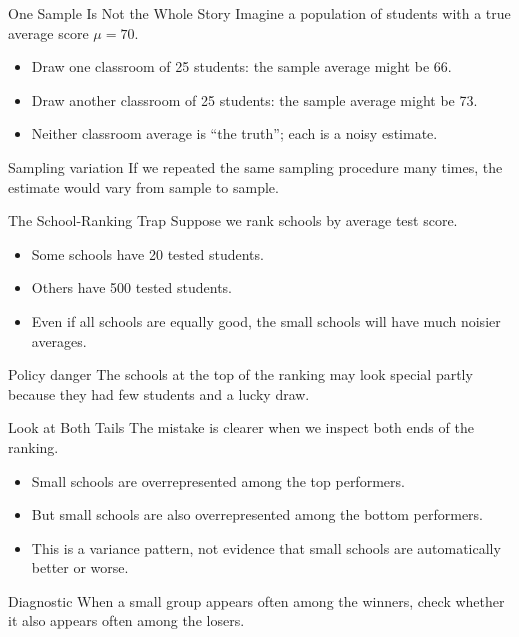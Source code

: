 \documentclass[11pt,aspectratio=169]{beamer}
\begin{document}
\begin{frame}{One Sample Is Not the Whole Story}
  Imagine a population of students with a true average score \(\mu=70\).
  \begin{itemize}
    \item Draw one classroom of 25 students: the sample average might be 66.
    \item Draw another classroom of 25 students: the sample average might be 73.
    \item Neither classroom average is ``the truth''; each is a noisy estimate.
  \end{itemize}
  \vspace{0.3em}
  \begin{block}{Sampling variation}
    If we repeated the same sampling procedure many times, the estimate would vary from sample to sample.
  \end{block}
\end{frame}

\begin{frame}{The School-Ranking Trap}
  Suppose we rank schools by average test score.
  \begin{itemize}
    \item Some schools have 20 tested students.
    \item Others have 500 tested students.
    \item Even if all schools are equally good, the small schools will have much noisier averages.
  \end{itemize}
  \vspace{0.3em}
  \begin{block}{Policy danger}
    The schools at the top of the ranking may look special partly because they had few students and a lucky draw.
  \end{block}
\end{frame}

\begin{frame}{Look at Both Tails}
  The mistake is clearer when we inspect both ends of the ranking.
  \begin{itemize}
    \item Small schools are overrepresented among the top performers.
    \item But small schools are also overrepresented among the bottom performers.
    \item This is a variance pattern, not evidence that small schools are automatically better or worse.
  \end{itemize}
  \vspace{0.3em}
  \begin{block}{Diagnostic}
    When a small group appears often among the winners, check whether it also appears often among the losers.
  \end{block}
\end{frame}
\end{document}
